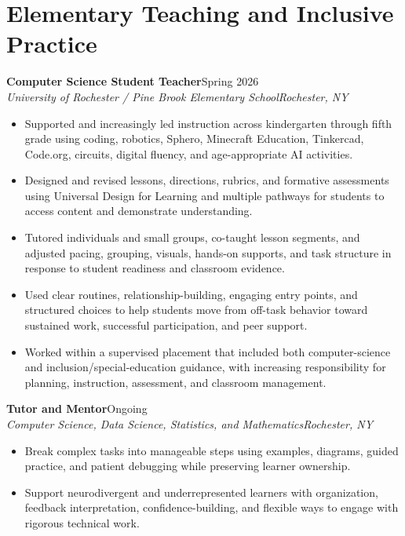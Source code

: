 \documentclass[10pt,letterpaper]{article}
\newcommand{\role}[4]{%
  \textbf{#1}\hfill #2\\
  \textit{#3}\hfill \textit{#4}\vspace{-3pt}
}
\begin{document}
\section*{Elementary Teaching and Inclusive Practice}
\role{Computer Science Student Teacher}{Spring 2026}
{University of Rochester / Pine Brook Elementary School}{Rochester, NY}
\begin{itemize}
  \item Supported and increasingly led instruction across kindergarten through
    fifth grade using coding, robotics, Sphero, Minecraft Education, Tinkercad,
    Code.org, circuits, digital fluency, and age-appropriate AI activities.
  \item Designed and revised lessons, directions, rubrics, and formative
    assessments using Universal Design for Learning and multiple pathways for
    students to access content and demonstrate understanding.
  \item Tutored individuals and small groups, co-taught lesson segments, and
    adjusted pacing, grouping, visuals, hands-on supports, and task structure in
    response to student readiness and classroom evidence.
  \item Used clear routines, relationship-building, engaging entry points, and
    structured choices to help students move from off-task behavior toward
    sustained work, successful participation, and peer support.
  \item Worked within a supervised placement that included both computer-science
    and inclusion/special-education guidance, with increasing responsibility
    for planning, instruction, assessment, and classroom management.
\end{itemize}

\role{Tutor and Mentor}{Ongoing}
{Computer Science, Data Science, Statistics, and Mathematics}{Rochester, NY}
\begin{itemize}
  \item Break complex tasks into manageable steps using examples, diagrams,
    guided practice, and patient debugging while preserving learner ownership.
  \item Support neurodivergent and underrepresented learners with organization,
    feedback interpretation, confidence-building, and flexible ways to engage
    with rigorous technical work.
\end{itemize}
\end{document}
